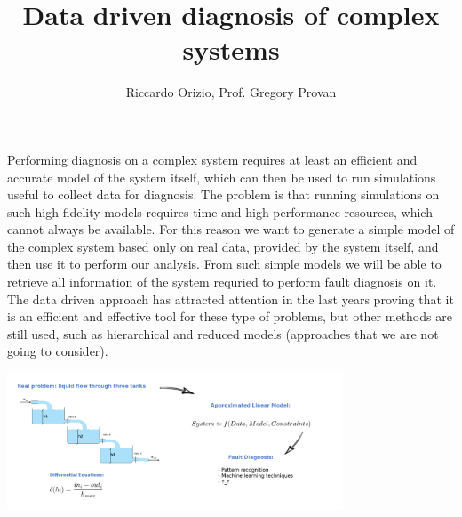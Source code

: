 \documentclass{tikzposter}
\title{Data driven diagnosis of complex systems}
\author{Riccardo Orizio, Prof. Gregory Provan}
\institute{University College Cork}
\begin{document}
	\maketitle[width=0.9\textwidth]

	{
		Performing diagnosis on a complex system requires at least an efficient
		and accurate model of the system itself, which can then be used to
		run simulations useful to collect data for diagnosis.
		The problem is that running simulations on such high fidelity models
		requires time and high performance resources, which cannot always be
		available.
		For this reason we want to generate a simple model of the complex system
		based only on real data, provided by the system itself, and then use it
		to perform our analysis.
		From such simple models we will be able to retrieve all information of
		the system requried to perform fault diagnosis on it.
		The data driven approach has attracted attention in the last years
		proving that it is an efficient and effective tool for these type of
		problems, but other methods are still used, such as hierarchical and
		reduced models (approaches that we are not going to consider).

		\begin{center}
			\includegraphics[width=0.75\textwidth]{./Images/3tanks.png}
		\end{center}
	}
\end{document}
